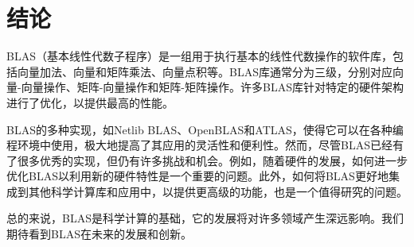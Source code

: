 \documentclass{ctexart}
\begin{document}
\section{结论}
BLAS（基本线性代数子程序）是一组用于执行基本的线性代数操作的软件库，包括向量加法、向量和矩阵乘法、向量点积等。BLAS库通常分为三级，分别对应向量-向量操作、矩阵-向量操作和矩阵-矩阵操作。许多BLAS库针对特定的硬件架构进行了优化，以提供最高的性能。

BLAS的多种实现，如Netlib BLAS、OpenBLAS和ATLAS，使得它可以在各种编程环境中使用，极大地提高了其应用的灵活性和便利性。然而，尽管BLAS已经有了很多优秀的实现，但仍有许多挑战和机会。例如，随着硬件的发展，如何进一步优化BLAS以利用新的硬件特性是一个重要的问题。此外，如何将BLAS更好地集成到其他科学计算库和应用中，以提供更高级的功能，也是一个值得研究的问题。

总的来说，BLAS是科学计算的基础，它的发展将对许多领域产生深远影响。我们期待看到BLAS在未来的发展和创新。
\end{document}
